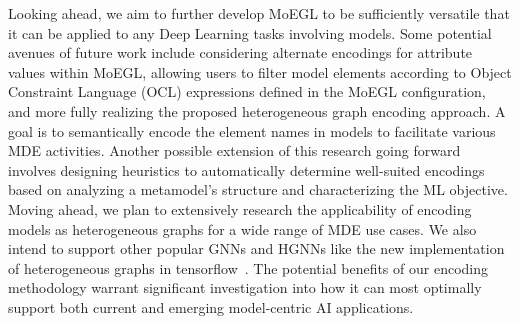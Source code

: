 \documentclass[journal,article,submit,moreauthors,technologies]{Definitions/mdpi}
\begin{document}
Looking ahead, we aim to further develop MoEGL to be sufficiently versatile that it can be applied to any Deep Learning tasks involving models. Some potential avenues of future work include considering alternate encodings for attribute values within MoEGL, allowing users to filter model elements according to Object Constraint Language (OCL) expressions defined in the MoEGL configuration, and more fully realizing the proposed heterogeneous graph encoding approach. A goal is to semantically encode the element names in models to facilitate various MDE activities. Another possible extension of this research going forward involves designing heuristics to automatically determine well-suited encodings based on analyzing a metamodel's structure and characterizing the ML objective. Moving ahead, we plan to extensively research the applicability of encoding models as heterogeneous graphs for a wide range of MDE use cases. We also intend to support other popular GNNs and HGNNs like the new implementation of heterogeneous graphs in tensorflow~\cite{HPyG_Tensorflow}. The potential benefits of our encoding methodology warrant significant investigation into how it can most optimally support both current and emerging model-centric AI applications.

\vspace{6pt}






\end{document}
